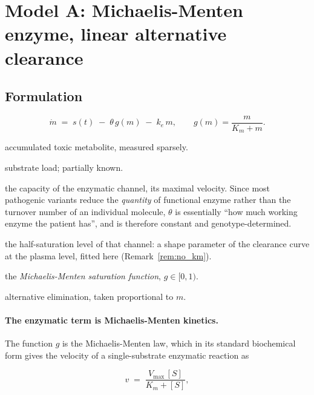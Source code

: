 \section{Model A: Michaelis-Menten enzyme, linear alternative clearance}

\subsection{Formulation}

\begin{equation}
\dot m \;=\; s(t) \;-\; \theta\, g(m) \;-\; k_e\, m,
\qquad g(m) = \frac{m}{K_m + m}.
\label{eq:A}
\end{equation}

\begin{description}[leftmargin=1.4em, itemsep=1pt]
\item[$m(t)$] accumulated toxic metabolite, measured sparsely.
\item[$s(t)$] substrate load; partially known.
\item[$\theta$] the capacity of the enzymatic channel, its maximal velocity. Since most
pathogenic variants reduce the \emph{quantity} of functional enzyme rather than the turnover
number of an individual molecule, $\theta$ is essentially ``how much working enzyme the
patient has'', and is therefore constant and genotype-determined.
\item[$K_m$] the half-saturation level of that channel: a shape parameter of the clearance
curve at the plasma level, fitted here (Remark~\ref{rem:no_km}).
\item[$g(m)$] the \emph{Michaelis-Menten saturation function}, $g \in [0,1)$.
\item[$k_e m$] alternative elimination, taken proportional to $m$.
\end{description}

\paragraph{The enzymatic term is Michaelis-Menten kinetics.} The function $g$ is the
Michaelis-Menten law, which in its standard biochemical form gives the velocity of a
single-substrate enzymatic reaction as

\begin{equation}
v \;=\; \frac{V_{\max}\,[S]}{K_m + [S]},
\label{eq:mm}
\end{equation}

